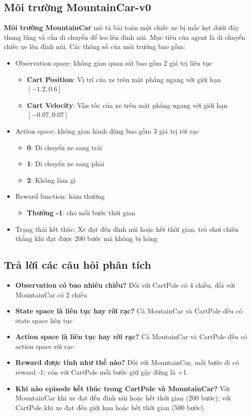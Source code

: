 \subsection{Môi trường MountainCar-v0}
\textbf{Môi trường MountainCar} mô tả bài toán một chiếc xe bị mắc kẹt dưới đáy thung lũng và cần di chuyển để leo lên đỉnh núi. Mục tiêu của agent là di chuyển chiếc xe lên đỉnh núi.
Các thông số của môi trường bao gồm:
\begin{itemize}
    \item Observation space: không gian quan sát bao gồm 2 giá trị liên tục
    \begin{itemize}
        \item \textbf{Cart Position}: Vị trí của xe trên mặt phẳng ngang với giới hạn $[-1.2, 0.6]$
        \item \textbf{Cart Velocity}: Vận tốc của xe trên mặt phẳng ngang với giới hạn $[-0.07, 0.07]$
    \end{itemize}
    \item Action space: không gian hành động bao gồm 3 giá trị rời rạc
    \begin{itemize}
        \item \textbf{0}: Di chuyển xe sang trái
        \item \textbf{1}: Di chuyển xe sang phải
        \item \textbf{2}: Không làm gì
    \end{itemize}
    \item Reward function: hàm thưởng
    \begin{itemize}
        \item \textbf{Thưởng -1}: cho mỗi bước thời gian
    \end{itemize}
    \item Trạng thái kết thúc: Xe đạt đến đỉnh núi hoặc hết thời gian, trò chơi chiến thắng khi đạt được 200 bước mà không bị hỏng
\end{itemize}

\subsection{Trả lời các câu hỏi phân tích}
\begin{itemize}
    \item \textbf{Observation có bao nhiêu chiều?} Đối với CartPole có 4 chiều, đối với MountainCar có 2 chiều
    \item \textbf{State space là liên tục hay rời rạc?} Cả MoutainCar và CartPole đều có state space liên tục
    \item \textbf{Action space là liên tục hay rời rạc?} Cả MoutainCar và CartPole đều có action space rời rạc
    \item \textbf{Reward được tính như thế nào?} Đối với MountainCar, mỗi bước đi có reward -1; còn với CartPole mỗi bước giữ gậy đứng là +1.
    \item \textbf{Khi nào episode kết thúc trong CartPole và MountainCar?} Với MountainCar khi xe đạt đến đỉnh núi hoặc hết thời gian (200 bước); với CartPole khi xe đạt đến giới hạn hoặc hết thời gian (500 bước).
\end{itemize}

